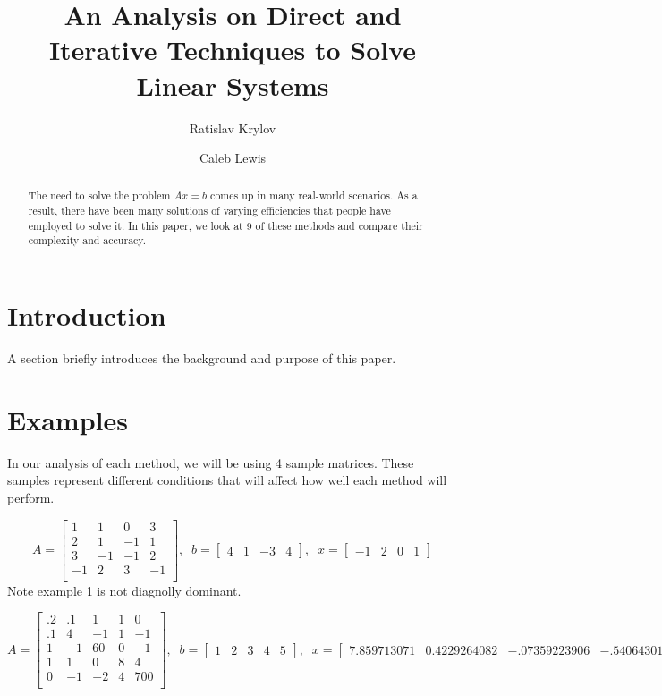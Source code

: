 \documentclass[11pt]{article}	%
\title{An Analysis on Direct and Iterative Techniques to Solve Linear Systems}
\author{Ratislav Krylov \and Caleb Lewis}
\begin{document}
\maketitle

\begin{abstract}
    The need to solve the problem $Ax = b$ comes up in many real-world scenarios.
    As a result, there have been many solutions of varying efficiencies that people
    have employed to solve it. In this paper, we look at 9 of these methods and
    compare their complexity and accuracy.
\end{abstract}

\section{Introduction}
A section briefly introduces the background and purpose of this paper.

\section{Examples}
In our analysis of each method, we will be using 4 sample matrices. These samples represent different conditions that will affect how well each method will perform.

\begin{equation}\label{eq:sample1}
    A = \begin{bmatrix}
            1 & 1 & 0 & 3 \\
            2 & 1 &  -1 & 1 \\
            3 & -1 & -1 & 2 \\
            -1 & 2 & 3 & -1  \\
        \end{bmatrix}
    ,\;\;
    b = \begin{bmatrix}
            4 & 1 & -3 & 4
        \end{bmatrix}
    ,\;\;
    x = \begin{bmatrix}
            -1 & 2 & 0 & 1
        \end{bmatrix}
\end{equation}
Note example 1 is not diagnolly dominant.

\begin{equation}\label{eq:sample2}
    A = \begin{bmatrix}
            .2 & .1 & 1 & 1 & 0 \\
            .1 & 4 & -1 & 1 & -1 \\
            1 & -1 & 60 & 0 & -1 \\
            1 & 1 & 0 & 8 & 4  \\
            0 & -1 & -2 & 4 & 700  \\
        \end{bmatrix}
    ,\;\;
    b = \begin{bmatrix}
            1 & 2 & 3 & 4 & 5
        \end{bmatrix}
    ,\;\;
    x = \begin{bmatrix}
            7.859713071 & 0.4229264082 & -.07359223906 & -.5406430164 & .01062616286
        \end{bmatrix}
\end{equation}
\end{document}
